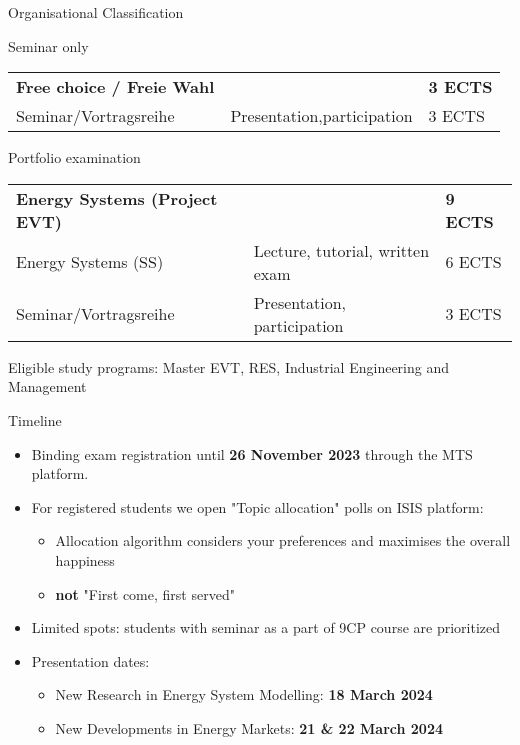 \documentclass[10pt,aspectratio=169,dvipsnames]{beamer}
\begin{document}
\begin{frame}{Organisational Classification}

    \begin{block}{Seminar only}
          \begin{tabularx}{0.8\textwidth}{l l l}
            \textbf{Free choice / Freie Wahl} & & \textbf{3 ECTS}\\
            Seminar/Vortragsreihe & Presentation,participation & 3 ECTS
          \end{tabularx}
    \end{block}
    \begin{block}{Portfolio examination}
    \begin{tabularx}{0.8\textwidth}{l l l}
            \textbf{Energy Systems (Project EVT)} & & \textbf{9 ECTS}\\
            Energy Systems (SS)   & Lecture, tutorial, written exam & 6 ECTS \\
            Seminar/Vortragsreihe & Presentation, participation     & 3 ECTS
      \end{tabularx}
      \newline
      \newline
      Eligible study programs: Master EVT, RES, Industrial Engineering and Management
  \end{block}
          


\end{frame}


\begin{frame}{Timeline}

  \begin{itemize}
    \item Binding exam registration until \textbf{26 November 2023} through the MTS platform.
    \item For registered students we open "Topic allocation" polls on ISIS platform: 
        \begin{itemize}
            \item Allocation algorithm considers your preferences and maximises the overall happiness
            \item \textbf{not} "First come, first served"
          \end{itemize}
    \item Limited spots: students with seminar as a part of 9CP course are prioritized
    \item Presentation dates:
          \begin{itemize}
            \item New Research in Energy System Modelling: \textbf{18 March 2024}
            \item New Developments in Energy Markets: \textbf{21 \& 22  March 2024}
          \end{itemize}
  \end{itemize}

\end{frame}
\end{document}
